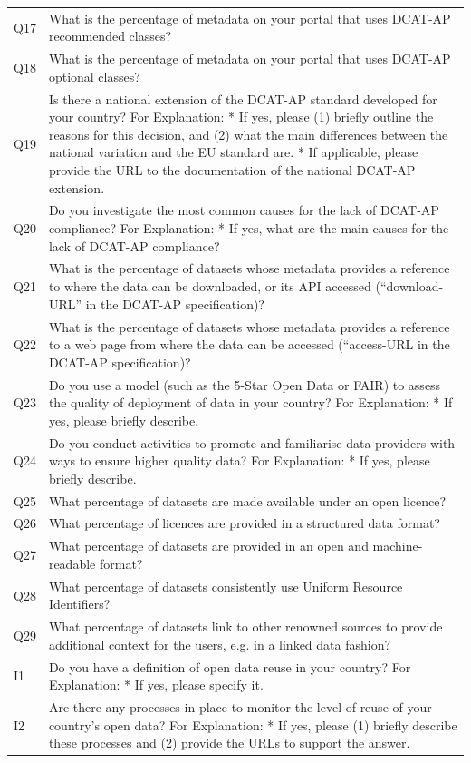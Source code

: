 {\begin{longtable}[]{@{}
  L{0.1386}
  L{0.8614}@{}}
Q17 & What is the percentage of metadata on your portal that uses DCAT-AP recommended classes? \\
Q18 & What is the percentage of metadata on your portal that uses DCAT-AP optional classes? \\
Q19 & Is there a national extension of the DCAT-AP standard developed for your country? For Explanation: * If yes, please (1) briefly outline the reasons for this decision, and (2) what the main differences between the national variation and the EU standard are. * If applicable, please provide the URL to the documentation of the national DCAT-AP extension. \\
Q20 & Do you investigate the most common causes for the lack of DCAT-AP compliance? For Explanation: * If yes, what are the main causes for the lack of DCAT-AP compliance? \\
Q21 & What is the percentage of datasets whose metadata provides a reference to where the data can be downloaded, or its API accessed (``download-URL'' in the DCAT-AP specification)? \\
Q22 & What is the percentage of datasets whose metadata provides a reference to a web page from where the data can be accessed (``access-URL in the DCAT-AP specification)? \\
Q23 & Do you use a model (such as the 5-Star Open Data or FAIR) to assess the quality of deployment of data in your country? For Explanation: * If yes, please briefly describe. \\
Q24 & Do you conduct activities to promote and familiarise data providers with ways to ensure higher quality data? For Explanation: * If yes, please briefly describe. \\
Q25 & What percentage of datasets are made available under an open licence? \\
Q26 & What percentage of licences are provided in a structured data format? \\
Q27 & What percentage of datasets are provided in an open and machine-readable format? \\
Q28 & What percentage of datasets consistently use Uniform Resource Identifiers? \\
Q29 & What percentage of datasets link to other renowned sources to provide additional context for the users, e.g. in a linked data fashion? \\
I1 & Do you have a definition of open data reuse in your country? For Explanation: * If yes, please specify it. \\
I2 & Are there any processes in place to monitor the level of reuse of your country's open data? For Explanation: * If yes, please (1) briefly describe these processes and (2) provide the URLs to support the answer. \\

\end{longtable}}
